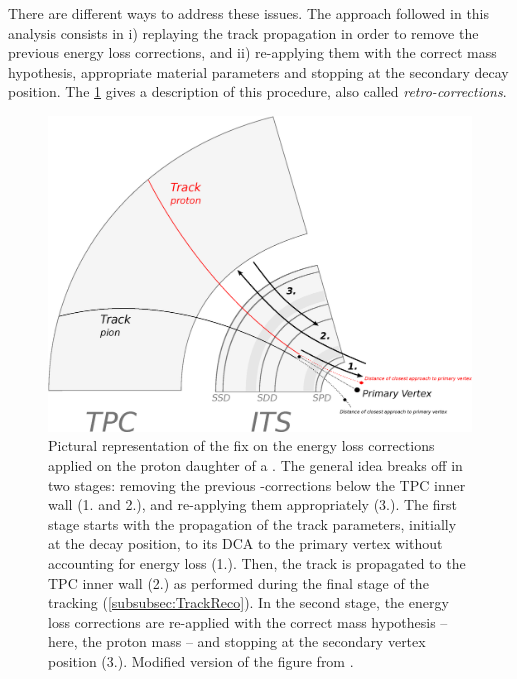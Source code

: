 There are different ways to address these issues. The approach followed in this analysis consists in i) replaying the track propagation in order to remove the previous energy loss corrections, and ii) re-applying them with the correct mass hypothesis, appropriate material parameters and stopping at the secondary decay position. The \fig\ref{fig:SchemeRetroCorrection} gives a description of this procedure, also called \textit{retro-corrections}.

\begin{figure}[t]
	\centering
	\includegraphics[width=1\textwidth]{Figs/Chapter5/Schema-RetroCorrections.eps}
	\caption{Pictural representation of the fix on the energy loss corrections applied on the proton daughter of a \rmLambdaPM. The general idea breaks off in two stages: removing the previous \dEdx-corrections below the TPC inner wall (1. and 2.), and re-applying them appropriately (3.). The first stage starts with the propagation of the track parameters, initially at the decay position, to its DCA to the primary vertex without accounting for energy loss (1.). Then, the track is propagated to the TPC inner wall (2.) as performed during the final stage of the tracking (\Sec\ref{subsubsec:TrackReco}). In the second stage, the energy loss corrections are re-applied with the correct mass hypothesis -- here, the proton mass -- and stopping at the secondary vertex position (3.). Modified version of the figure from \cite{maireTrackReconstructionPrinciple2011}.}
	\label{fig:SchemeRetroCorrection}
\end{figure}

